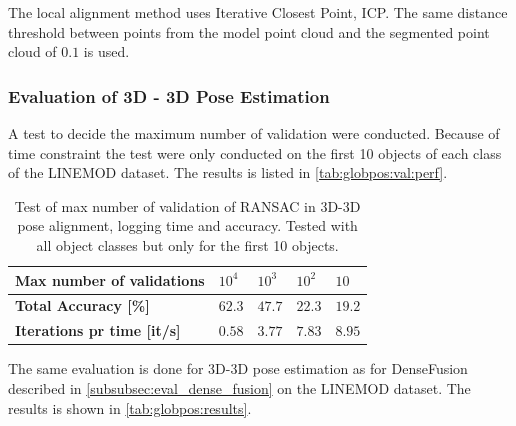 \documentclass[../main.tex]{subfiles}
\begin{document}
The local alignment method uses Iterative Closest Point, ICP. The same distance threshold between points from the model point cloud and the segmented point cloud of $0.1$ is used. 

\subsubsection{Evaluation of 3D - 3D Pose Estimation}
A test to decide the maximum number of validation were conducted. Because of time constraint the test were only conducted on the first 10 objects of each class of the LINEMOD dataset. The results is listed in \autoref{tab:globpos:val:perf}.
\begin{table}[H]
\centering
\begin{tabular}{l|llll}
\toprule
\textbf{Max number of validations} & $10^4$ & $10^3$ & $10^2$ & $10$ \\ \hline
\textbf{Total Accuracy [\%]} & $62.3$ & $47.7$ & $22.3$ & $19.2$ \\ \hline
\textbf{Iterations pr time [it/s]} & $0.58$ & $3.77$ & $7.83$ & $8.95$ \\ \bottomrule
\end{tabular}
\caption{Test of max number of validation of RANSAC in 3D-3D pose alignment, logging time and accuracy. Tested with all object classes but only for the first 10 objects.  }
\label{tab:globpos:val:perf}
\end{table}

The same evaluation is done for 3D-3D pose estimation as for DenseFusion described in \autoref{subsubsec:eval_dense_fusion} on the LINEMOD dataset. The results is shown in \autoref{tab:globpos:results}.
\end{document}
